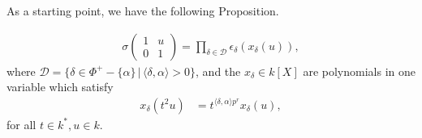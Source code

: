 As a starting point, we have the following Proposition.

\begin{proposition} \label{claim1}
\begin{align*}
\sigma\left(\begin{matrix} 1 & u \\ 0 & 1 \end{matrix}\right) = \prod_{\delta\in\mathcal{D}} \epsilon_\delta\left(x_\delta\left(u\right)\right),
\end{align*}
where $\mathcal{D} = \{\delta \in \Phi^+-\{\alpha\}\,|\, \langle \delta, \alpha \rangle > 0\}$, and the $x_\delta\in k[X]$ are polynomials in one variable which satisfy
\begin{align}\label{eqn:x}
x_\delta\left(t^2u\right) &= t^{\langle \delta, \alpha \rangle p^r} x_\delta\left(u\right),
\end{align}
for all $t \in k^*, u\in k$.
\end{proposition}
